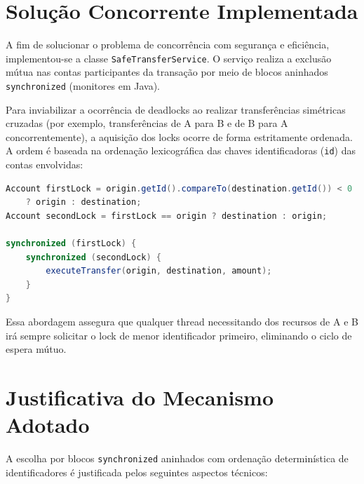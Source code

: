 \documentclass[12pt,a4paper]{article}
\begin{document}
\section{Solução Concorrente Implementada}

\noindent A fim de solucionar o problema de concorrência com segurança e eficiência, implementou-se a classe \texttt{SafeTransferService}. O serviço realiza a exclusão mútua nas contas participantes da transação por meio de blocos aninhados \texttt{synchronized} (monitores em Java).

\noindent Para inviabilizar a ocorrência de deadlocks ao realizar transferências simétricas cruzadas (por exemplo, transferências de A para B e de B para A concorrentemente), a aquisição dos locks ocorre de forma estritamente ordenada. A ordem é baseada na ordenação lexicográfica das chaves identificadoras (\texttt{id}) das contas envolvidas:

\begin{lstlisting}[language=Java]
Account firstLock = origin.getId().compareTo(destination.getId()) < 0 
    ? origin : destination;
Account secondLock = firstLock == origin ? destination : origin;

synchronized (firstLock) {
    synchronized (secondLock) {
        executeTransfer(origin, destination, amount);
    }
}
\end{lstlisting}

\noindent Essa abordagem assegura que qualquer thread necessitando dos recursos de A e B irá sempre solicitar o lock de menor identificador primeiro, eliminando o ciclo de espera mútuo.

\section{Justificativa do Mecanismo Adotado}

\noindent A escolha por blocos \texttt{synchronized} aninhados com ordenação determinística de identificadores é justificada pelos seguintes aspectos técnicos:
\end{document}

